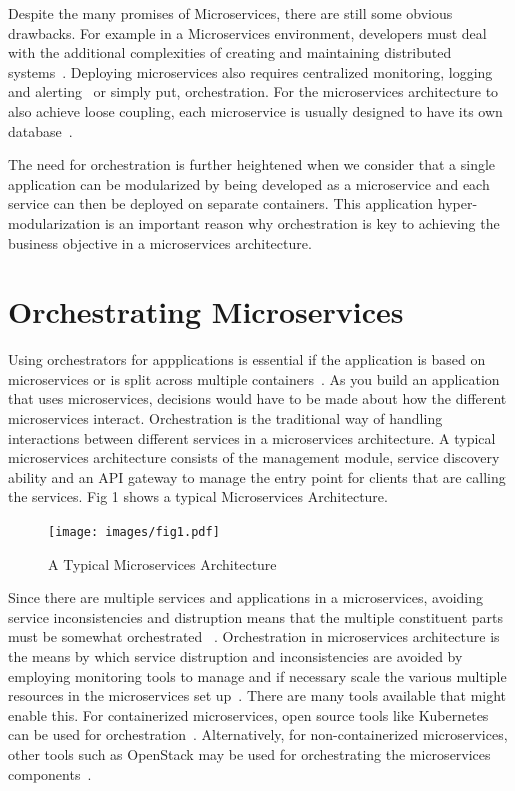 Despite the many promises of Microservices, there are still some
obvious drawbacks. For example in a Microservices environment,
developers must deal with the additional complexities of creating and
maintaining distributed
systems~\cite{hid-sp18-501-patterns}. Deploying microservices also
requires centralized monitoring, logging and
alerting~\cite{hid-sp18-501-challenges} or simply put,
orchestration. For the microservices architecture to also achieve
loose coupling, each microservice is usually designed to have its own
database~\cite{hid-sp18-501-patterns}.

The need for orchestration is further heightened when we consider that
a single application can be modularized by being developed as a
microservice and each service can then be deployed on separate
containers. This application hyper-modularization is an important
reason why orchestration is key to achieving the business objective in
a microservices architecture.


\section{Orchestrating Microservices}
Using orchestrators for appplications is essential if the application
is based on microservices or is split across multiple
containers~\cite{hid-sp18-501-dotnet}. As you build an application
that uses microservices, decisions would have to be made about how the
different microservices interact. Orchestration is the traditional way
of handling interactions between different services in a microservices
architecture. A typical microservices architecture consists of the
management module, service discovery ability and an API gateway to
manage the entry point for clients that are calling the services.  Fig
1 shows a typical Microservices Architecture.

\begin{figure}[!ht]
  \centering\texttt{[image: images/fig1.pdf]}
  \caption{A Typical Microservices Architecture~\cite{hid-sp18-501-fig1}}
\label{f:architecture}
\end{figure}

Since there are multiple services and applications in a microservices, 
avoiding
service inconsistencies and distruption means that the
multiple constituent parts must be somewhat orchestrated
~\cite{hid-sp18-501-opensource}. Orchestration in microservices 
architecture is the means by which service distruption and 
inconsistencies are avoided by employing monitoring tools to
manage and if necessary scale the various multiple resources 
in the microservices set up~\cite{hid-sp18-501-opensource}. 
There are many tools available 
that might enable this. For
containerized microservices, open source tools like Kubernetes
can be
used for orchestration~\cite{hid-sp18-501-onfido}. Alternatively, for
non-containerized microservices, other tools such as OpenStack may be
used for orchestrating the microservices
components~\cite{hid-sp18-501-rackspace}.

